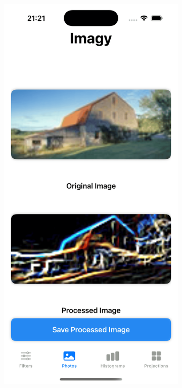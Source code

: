 \documentclass[a4paper]{article}
\begin{document}
\begin{figure}[H]
\begin{subfigure}{0.2\textwidth}
        \label{fig:dog_sobel}
    \end{subfigure}
    \hfill
    \begin{subfigure}{0.2\textwidth}
        \centering
        \includegraphics[width=\linewidth]{images/barn_sobel.png}

\end{subfigure}
\end{figure}
\end{document}
